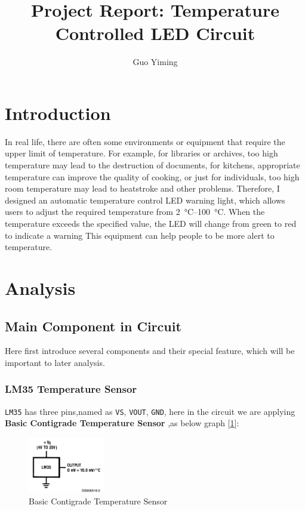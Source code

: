 \documentclass[12pt]{article}
\title{Project Report: Temperature Controlled LED Circuit}
\author[*]{Guo Yiming}
\affil[*]{
    Department of Physics, Xiamen University Malaysia}
\numberwithin{equation}{section}
\begin{document}
\maketitle




\section{Introduction}

In real life, there are often some environments or equipment that require the upper limit of temperature. For example, for libraries or archives, too high temperature may lead to the destruction of documents, for kitchens, appropriate temperature can improve the quality of cooking, or just for individuals, too high room temperature may lead to heatstroke and other problems. Therefore, I designed an automatic temperature control LED warning light, which allows users to adjust the required temperature from \qtyrange{2}{100}{\degreeCelsius}. When the temperature exceeds the specified value, the LED will change from green to red to indicate a warning This equipment can help people to be more alert to temperature.

\section{Analysis}
\subsection{Main Component in Circuit}
Here first introduce several components and their special feature, which will be important to later analysis.


\subsubsection{LM35 Temperature Sensor\cite{LM35}}

\verb|LM35| has three pins,named as \verb|VS|, \verb|VOUT|, \verb|GND|, here in the circuit we are applying 	\textbf{Basic Contigrade Temperature Sensor} \cite{LM35} ,as below graph [\ref{Fig.basic_contigrade}]:

\begin{figure}[H] %
\centering %
\includegraphics[width=0.3\textwidth]{LM35_basic_centigrade} %
\caption{Basic Contigrade Temperature Sensor} %
\label{Fig.basic_contigrade} %
\end{figure}
\end{document}
